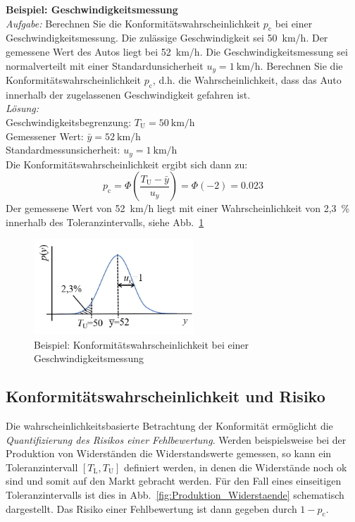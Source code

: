 \textbf{Beispiel: Geschwindigkeitsmessung} \\
\textsl{Aufgabe:} Berechnen Sie die Konformitätswahrscheinlichkeit $p_\mathrm{c}$ bei einer
Geschwindigkeitsmessung. Die zulässige Geschwindigkeit sei 50~km/h. Der gemessene Wert des Autos liegt bei 52~km/h. Die Geschwindigkeitsmessung sei normalverteilt mit einer Standardunsicherheit $u_y= 1~\mathrm{km/h}$. Berechnen Sie die Konformitätswahrscheinlichkeit
$p_\mathrm{c}$, d.h. die Wahrscheinlichkeit, dass das Auto innerhalb der zugelassenen Geschwindigkeit gefahren ist. \\
\textsl{Lösung:} \\
Geschwindigkeitsbegrenzung: $T_\mathrm{U} = 50~\textrm{km/h}$\\
Gemessener Wert: $\bar y = 52~\textrm{km/h}$ \\
Standardmessunsicherheit: $u_y = 1~\textrm{km/h} $ \\
Die Konformitätswahrscheinlichkeit ergibt sich dann zu:
\[
p_\mathrm{c} = \Phi \left( \frac{T_\mathrm{U}-\bar y}{u_y}\right) = \Phi(-2) = 0.023
\]
Der gemessene Wert von 52~km/h liegt mit einer Wahrscheinlichkeit von 2,3~\% innerhalb des To\-le\-ranz\-inter\-valls, siehe Abb.~\ref{fig:LoesungGeschwindigekeitsmessung}
\begin{figure}[!htp]
	\begin{center}
		\includegraphics[width=60mm]{05_vorlesung/media/Bsp_Geschwindigkeitsmessung.png}
		\caption{\label{fig:LoesungGeschwindigekeitsmessung} Beispiel: Konformitätswahrscheinlichkeit bei einer Geschwindigkeitsmessung}
	\end{center}
\end{figure}

\subsection{Konformitätswahrscheinlichkeit und Risiko}
Die wahrscheinlichkeitsbasierte Betrachtung der Konformität ermöglicht die \textsl{Quantifizierung des Risikos einer Fehlbewertung}. Werden beispielsweise bei der Produktion von Widerständen die Widerstandswerte gemessen, so kann ein Toleranzintervall $[T_\mathrm{L}, T_\mathrm{U}]$ definiert werden, in denen die Widerstände noch ok sind und somit auf den Markt gebracht werden. Für den Fall eines einseitigen Toleranzintervalls ist dies in Abb.~\ref{fig:Produktion_Widerstaende} schematisch
dargestellt. Das Risiko einer Fehlbewertung ist dann gegeben durch $1- p_\mathrm{c}$.\\

